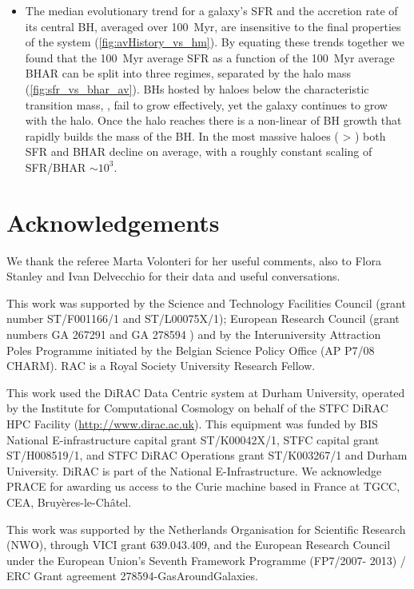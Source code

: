 \begin{itemize}
\item The median evolutionary trend for a galaxy's SFR and the accretion rate
of its central BH, averaged over 100~Myr, are insensitive to the final
properties of the system (\cref{fig:avHistory_vs_hm}). By equating these trends
together we found that the 100~Myr average SFR as a function of the 100~Myr
average BHAR can be split into three regimes, separated by the halo mass
(\cref{fig:sfr_vs_bhar_av}). BHs hosted by haloes below the characteristic
transition mass,  \citep[][ $\sim 10^{12}$\Msol]{Bower2017},
fail to grow effectively, yet the galaxy continues to grow with the halo. Once
the halo reaches  there is a non-linear  of BH growth
that rapidly builds the mass of the BH. In the most massive haloes ( >
) both SFR and BHAR decline on average, with a roughly constant scaling
of SFR/BHAR $\sim 10^{3}$.

\end{itemize}

\section*{Acknowledgements}

We thank the referee Marta Volonteri for her useful comments, also to Flora
Stanley and Ivan Delvecchio for their data and useful conversations. 

This work was supported by the Science and Technology Facilities Council (grant
number ST/F001166/1 and ST/L00075X/1); European Research Council (grant numbers
GA 267291  and GA 278594 ) and by
the Interuniversity Attraction Poles Programme initiated by the Belgian Science
Policy Office (AP P7/08 CHARM). RAC is a Royal Society University Research
Fellow.

This work used the DiRAC Data Centric system at Durham University, operated by
the Institute for Computational Cosmology on behalf of the STFC DiRAC HPC
Facility (\url{http://www.dirac.ac.uk}). This equipment was funded by BIS
National E-infrastructure capital grant ST/K00042X/1, STFC capital grant
ST/H008519/1, and STFC DiRAC Operations grant ST/K003267/1 and Durham
University. DiRAC is part of the National E-Infrastructure. We acknowledge
PRACE for awarding us access to the Curie machine based in France at TGCC, CEA,
Bruy\`{e}res-le-Ch\^{a}tel.

This work was supported by the Netherlands Organisation for Scientific Research
(NWO), through VICI grant 639.043.409, and the European Research Council under
the European Union's Seventh Framework Programme (FP7/2007- 2013) / ERC Grant
agreement 278594-GasAroundGalaxies.
